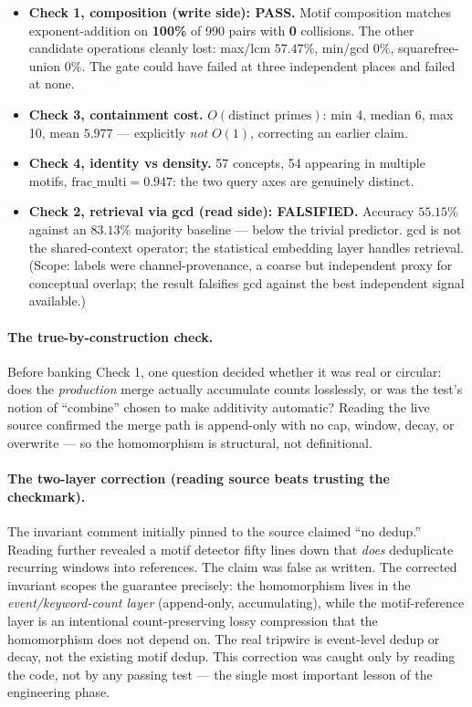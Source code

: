 \documentclass[11pt,a4paper]{article}
\theoremstyle{definition}
\theoremstyle{plain}
\begin{document}
\begin{itemize}[leftmargin=1.4em]
\item \textbf{Check 1, composition (write side): PASS.} Motif composition matches exponent-addition
on \textbf{100\%} of 990 pairs with \textbf{0} collisions. The other candidate operations cleanly
lost: max/lcm $57.47\%$, min/gcd $0\%$, squarefree-union $0\%$. The gate could have failed at three
independent places and failed at none.
\item \textbf{Check 3, containment cost.} $O(\text{distinct primes})$: min 4, median 6, max 10,
mean $5.977$ --- explicitly \emph{not} $O(1)$, correcting an earlier claim.
\item \textbf{Check 4, identity vs density.} 57 concepts, 54 appearing in multiple motifs,
$\text{frac\_multi}=0.947$: the two query axes are genuinely distinct.
\item \textbf{Check 2, retrieval via gcd (read side): FALSIFIED.} Accuracy $55.15\%$ against an
$83.13\%$ majority baseline --- below the trivial predictor. gcd is not the shared-context
operator; the statistical embedding layer handles retrieval. (Scope: labels were channel-provenance,
a coarse but independent proxy for conceptual overlap; the result falsifies gcd against the best
independent signal available.)
\end{itemize}

\paragraph{The true-by-construction check.} Before banking Check 1, one question decided whether it
was real or circular: does the \emph{production} merge actually accumulate counts losslessly, or was
the test's notion of ``combine'' chosen to make additivity automatic? Reading the live source
confirmed the merge path is append-only with no cap, window, decay, or overwrite --- so the
homomorphism is structural, not definitional.

\paragraph{The two-layer correction (reading source beats trusting the checkmark).} The invariant
comment initially pinned to the source claimed ``no dedup.'' Reading further revealed a motif
detector fifty lines down that \emph{does} deduplicate recurring windows into references. The
claim was false as written. The corrected invariant scopes the guarantee precisely: the
homomorphism lives in the \emph{event/keyword-count layer} (append-only, accumulating), while the
motif-reference layer is an intentional count-preserving lossy compression that the homomorphism
does not depend on. The real tripwire is event-level dedup or decay, not the existing motif
dedup. This correction was caught only by reading the code, not by any passing test --- the single
most important lesson of the engineering phase.
\end{document}

